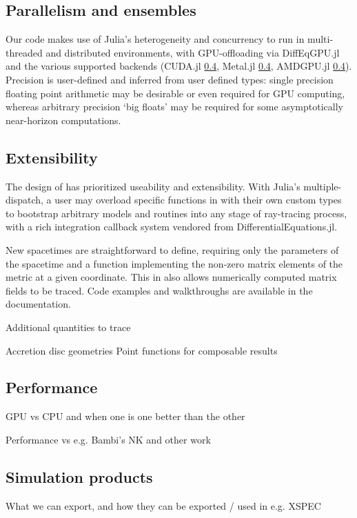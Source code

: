 \subsection{Parallelism and ensembles}

Our code makes use of Julia's heterogeneity and concurrency to run in multi-threaded and distributed environments, with GPU-offloading via DiffEqGPU.jl and the various supported backends (CUDA.jl \ref{}, Metal.jl \ref{}, AMDGPU.jl \ref{}). Precision is user-defined and inferred from user defined types: single precision floating point arithmetic may be desirable or even required for GPU computing, whereas arbitrary precision `big floats' may be required for some asymptotically near-horizon computations.



\subsection{Extensibility}

The design of \Gradus has prioritized useability and extensibility. With Julia's multiple-dispatch, a user may overload specific functions in \Gradus with their own custom types to bootstrap arbitrary models and routines into any stage of ray-tracing process, with a rich integration callback system vendored from DifferentialEquations.jl.

New spacetimes are straightforward to define, requiring only the parameters of the spacetime and a function implementing the non-zero matrix elements of the metric at a given coordinate. This in also allows numerically computed matrix fields to be traced. Code examples and walkthroughs are available in the \Gradus documentation.



Additional quantities to trace

Accretion disc geometries
Point functions for composable results


\subsection{Performance}
\label{sec:performance}

GPU vs CPU and when one is one better than the other

Performance vs e.g. Bambi's NK and other work

\subsection{Simulation products}

What we can export, and how they can be exported / used in e.g. XSPEC

